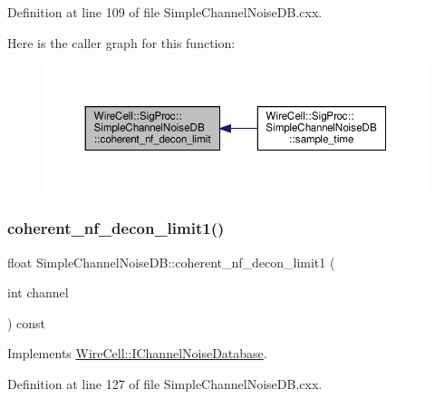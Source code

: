 Definition at line 109 of file Simple\+Channel\+Noise\+D\+B.\+cxx.

Here is the caller graph for this function\+:
\nopagebreak
\begin{figure}[H]
\begin{center}
\leavevmode
\includegraphics[width=350pt]{class_wire_cell_1_1_sig_proc_1_1_simple_channel_noise_d_b_a602938fd9dbdd7fe8093231a1d5c5d5a_icgraph}
\end{center}
\end{figure}
\mbox{\label{class_wire_cell_1_1_sig_proc_1_1_simple_channel_noise_d_b_a570a71f729172f7b19659f21d44b2e81}} 
\subsubsection{\texorpdfstring{coherent\+\_\+nf\+\_\+decon\+\_\+limit1()}{coherent\_nf\_decon\_limit1()}}
{\footnotesize\ttfamily float Simple\+Channel\+Noise\+D\+B\+::coherent\+\_\+nf\+\_\+decon\+\_\+limit1 (\begin{DoxyParamCaption}\item[{int}]{channel }\end{DoxyParamCaption}) const\hspace{0.3cm}{\ttfamily [virtual]}}



Implements \hyperlink{class_wire_cell_1_1_i_channel_noise_database_a4b2033312603fd90885efdfe14eb71cc}{Wire\+Cell\+::\+I\+Channel\+Noise\+Database}.



Definition at line 127 of file Simple\+Channel\+Noise\+D\+B.\+cxx.

